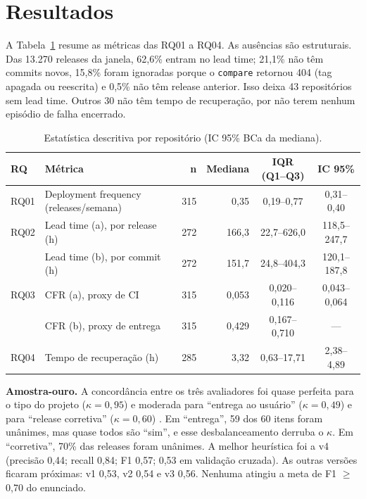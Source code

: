 \documentclass[12pt]{article}
\newcommand{\code}[1]{\texttt{\small #1}}
\begin{document}
\section{Resultados}

A Tabela~\ref{tab:desc} resume as métricas das RQ01 a RQ04. As ausências
são estruturais. Das 13.270 releases da janela, 62,6\% entram no lead time;
21,1\% não têm commits novos, 15,8\% foram ignoradas porque o \code{compare}
retornou 404 (tag apagada ou reescrita) e 0,5\% não têm release anterior.
Isso deixa 43 repositórios sem lead time. Outros 30 não têm tempo de
recuperação, por não terem nenhum episódio de falha encerrado.

\begin{table}[ht]
  \centering
  \caption{Estatística descritiva por repositório (IC 95\% BCa da mediana).}
  \label{tab:desc}
  \small
  \begin{tabular}{llrrcc}
    \toprule
    RQ & Métrica & n & Mediana & IQR (Q1--Q3) & IC 95\% \\
    \midrule
    RQ01 & Deployment frequency (releases/semana) & 315 & 0,35 & 0,19--0,77 & 0,31--0,40 \\
    RQ02 & Lead time (a), por release (h) & 272 & 166,3 & 22,7--626,0 & 118,5--247,7 \\
         & Lead time (b), por commit (h) & 272 & 151,7 & 24,8--404,3 & 120,1--187,8 \\
    RQ03 & CFR (a), proxy de CI & 315 & 0,053 & 0,020--0,116 & 0,043--0,064 \\
         & CFR (b), proxy de entrega & 315 & 0,429 & 0,167--0,710 & --- \\
    RQ04 & Tempo de recuperação (h) & 285 & 3,32 & 0,63--17,71 & 2,38--4,89 \\
    \bottomrule
  \end{tabular}
\end{table}

\textbf{Amostra-ouro.} A concordância entre os três avaliadores foi quase
perfeita para o tipo do projeto ($\kappa = 0{,}95$) e moderada para
``entrega ao usuário'' ($\kappa = 0{,}49$) e para ``release corretiva''
($\kappa = 0{,}60$) \cite{landis1977}. Em ``entrega'', 59 dos 60 itens foram
unânimes, mas quase todos são ``sim'', e esse desbalanceamento derruba o
$\kappa$. Em ``corretiva'', 70\% das releases foram unânimes. A melhor
heurística foi a v4 (precisão 0,44; recall 0,84; F1 0,57; 0,53 em validação
cruzada). As outras versões ficaram próximas: v1 0,53, v2 0,54 e v3 0,56.
Nenhuma atingiu a meta de F1 $\geq$ 0,70 do enunciado.
\end{document}
